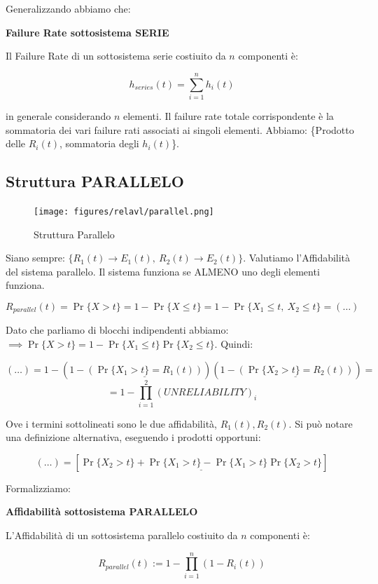 Generalizzando abbiamo che:

\begin{thrm}{\textbf{Failure Rate sottosistema SERIE}}

Il Failure Rate di un sottosistema serie costiuito da $n$ componenti è:

\[
	h_{series}(t) = \sum_{i=1}^n{h_i(t)}
\]

\end{thrm}

in generale considerando $n$ elementi. Il failure rate totale corrispondente è la sommatoria dei vari failure rati associati ai singoli elementi. Abbiamo: \{Prodotto delle $R_i(t)$, sommatoria degli $h_i(t)$\}.

\subsection{Struttura PARALLELO}

\begin{center}
\begin{figure}[H]
\centering
\texttt{[image: figures/relavl/parallel.png]}
\caption{Struttura Parallelo}
\end{figure}
\end{center}

Siano sempre: $\{R_1(t)\rightarrow E_1(t),\ R_2(t)\rightarrow E_2(t)\}$. Valutiamo l'Affidabilità del sistema parallelo. Il sistema funziona se ALMENO uno degli elementi funziona.

\[
	R_{parallel}(t) = \Pr\{X > t\} = 1-\Pr\{X\leq t\} = 1-\Pr\{X_1\leq t,\ X_2\leq t\} = (\dots)
\]

Dato che parliamo di blocchi indipendenti abbiamo: $\implies \Pr\{X > t\} = 1-\Pr\{X_1\leq t\}\Pr\{X_2\leq t\}$. Quindi:

\[
	(\dots) = 1-(1-\underline{(\Pr\{X_1 > t\} = R_1(t))})(1-\underline{(\Pr\{X_2 > t\} = R_2(t))}) =
\]
\[
	= 1-\prod_{i=1}^2{(UNRELIABILITY)_i}
\]

Ove i termini sottolineati sono le due affidabilità, $R_1(t),R_2(t)$. Si può notare una definizione alternativa, eseguendo i prodotti opportuni:

\[
	(\dots) = [\underline{\Pr\{X_2>t\} + \Pr\{X_1>t\} - \Pr\{X_1>t\}\Pr\{X_2>t\}}]
\]

Formalizziamo:

\begin{thrm}{\textbf{Affidabilità sottosistema PARALLELO}}

L'Affidabilità di un sottosistema parallelo costiuito da $n$ componenti è:

\[
	R_{parallel}(t) := 1-\prod_{i=1}^n{(1-R_i(t))}
\]

\end{thrm}

